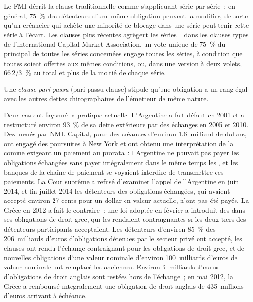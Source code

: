 Le FMI décrit la clause traditionnelle comme s'appliquant série par série~: en général, 75~\% des
détenteurs d'une même obligation peuvent la modifier, de sorte qu'un créancier qui achète une minorité de blocage dans une série
peut tenir cette série à l'écart. Les clauses plus récentes agrègent les séries~: dans les clauses types
de l'International Capital Market Association, un vote unique de 75~\% du principal de toutes les
séries concernées engage toutes les séries, à condition que toutes soient offertes aux mêmes conditions, ou,
dans une version à deux volets, 66\,2/3~\% au total et plus de la moitié de chaque série.

\begin{definition}\label{def:m2:distressed-sovereign-and-bank-capital-credit:pp}
Une \emph{clause pari passu} (pari passu clause) stipule qu'une obligation a un rang égal
avec les autres dettes chirographaires de l'émetteur de même nature.
\end{definition}

Deux cas ont façonné la pratique actuelle. L'Argentine a fait défaut en 2001 et a restructuré environ
93~\% de sa dette extérieure par des échanges en 2005 et 2010. Des  menés par NML Capital,
pour des créances d'environ 1.6~milliard de dollars, ont engagé des poursuites à New York et ont obtenu une interprétation de la  comme exigeant un paiement au prorata~: l'Argentine ne pouvait pas payer les obligations échangées
sans payer intégralement dans le même temps les , et les banques de la chaîne de paiement
se voyaient interdire de transmettre ces paiements. La Cour suprême a refusé d'examiner l'appel de l'Argentine
en juin 2014, et fin juillet 2014 les détenteurs des obligations échangées, qui avaient
accepté environ 27 cents pour un dollar en valeur actuelle, n'ont pas été payés. La Grèce en 2012
a fait le contraire~: une loi adoptée en février a introduit des  dans
ses obligations de droit grec, qui les rendaient contraignantes si les deux tiers des détenteurs participants acceptaient. Les détenteurs
d'environ 85~\% des 206~milliards d'euros d'obligations détenues par le secteur privé ont accepté, les clauses
ont rendu l'échange contraignant pour les obligations de droit grec, et de nouvelles obligations d'une valeur nominale d'environ 100~milliards d'euros
de valeur nominale ont remplacé les anciennes. Environ 6~milliards d'euros d'obligations de droit anglais sont restées hors de l'échange~; en
mai 2012, la Grèce a remboursé intégralement une obligation de droit anglais de 435~millions d'euros arrivant à échéance.


